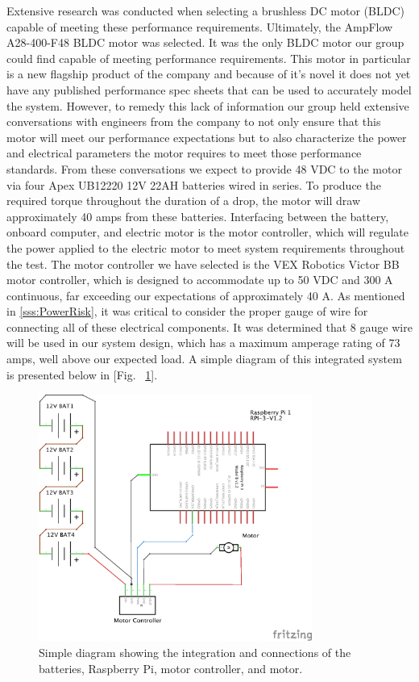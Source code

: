 Extensive research was conducted when selecting a brushless DC motor (BLDC) capable of meeting these performance requirements. Ultimately, the AmpFlow A28-400-F48 BLDC motor was selected. It was the only BLDC motor our group could find capable of meeting performance requirements. This motor in particular is a new flagship product of the company and because of it's novel it does not yet have any published performance spec sheets that can be used to accurately model the system. However, to remedy this lack of information our group held extensive conversations with engineers from the company to not only ensure that this motor will meet our performance expectations but to also characterize the power and electrical parameters the motor requires to meet those performance standards. From these conversations we expect to provide 48 VDC to the motor via four Apex UB12220 12V 22AH batteries wired in series. To produce the required torque throughout the duration of a drop, the motor will draw approximately 40 amps from these batteries. Interfacing between the battery, onboard computer, and electric motor is the motor controller, which will regulate the power applied to the electric motor to meet system requirements throughout the test. The motor controller we have selected is the VEX Robotics Victor BB motor controller, which is designed to accommodate up to 50 VDC and 300 A continuous, far exceeding our expectations of approximately 40 A. As mentioned in \ref{sss:PowerRisk}, it was critical to consider the proper gauge of wire for connecting all of these electrical components. It was determined that 8 gauge wire will be used in our system design, which has a maximum amperage rating of 73 amps, well above our expected load. A simple diagram of this integrated system is presented below in [Fig. ~\ref{fig:rpi_controller_motor_schem}].

\begin{figure}[ht]
  \centering
  \includegraphics[width=0.8\textwidth]{Controls/rpi_controller_motor_schem.png}
  \caption{\label{fig:rpi_controller_motor_schem}Simple diagram showing the integration and connections of the batteries, Raspberry Pi, motor controller, and motor.}
\end{figure}

